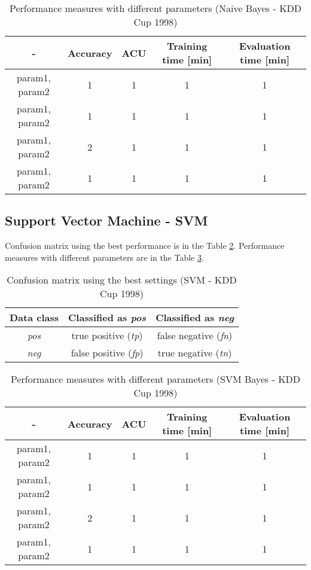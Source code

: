 \documentclass[11pt,a4paper,titlepage]{article}
\begin{document}
  \begin{table}
  \centering
  \begin{tabular}{| c | c | c | c | c |}
    \hline
     		-	   & Accuracy & 	ACU 	& Training time [min] & Evaluation time [min] \\ \hline
    param1, param2 &  1 	  &     1		& 		1			  & 		1 		\\ \hline
    param1, param2 & 	1	  & 	1 		& 		1			  &			1 		\\ \hline
    param1, param2 & 	2	  & 	1		& 		1			  &			1		\\ \hline
    param1, param2 &  1       & 	1		& 		1			  &			1			\\
    \hline
  \end{tabular}
  \caption{Performance measures with different parameters (Naive Bayes - KDD Cup 1998)}
  \label{table:BayesKDD}
  \end{table}
  
\subsection{Support Vector Machine - SVM}

Confusion matrix using the best performance is in the Table \ref{table:confusionMatrixSVMKDD}. Performance measures with different parameters are in the Table \ref{table:SVMKDD}.
\begin{table}
  \centering
  \begin{tabular}{| c | c | c |}
    \hline
    Data class & Classified as \textit{pos} & Classified as \textit{neg} \\ \hline
    \textit{pos} & true positive (\textit{tp}) & false negative (\textit{fn}) \\ \hline
    \textit{neg} & false positive (\textit{fp}) & true negative (\textit{tn}) \\
    \hline
  \end{tabular}
  \caption{Confusion matrix using the best settings (SVM - KDD Cup 1998)}
  \label{table:confusionMatrixSVMKDD}
  \end{table}
  
  \begin{table}
  \centering
  \begin{tabular}{| c | c | c | c | c |}
    \hline
     		-	   & Accuracy & 	ACU 	& Training time [min] & Evaluation time [min] \\ \hline
    param1, param2 &  1 	  &     1		& 		1			  & 		1 		\\ \hline
    param1, param2 & 	1	  & 	1 		& 		1			  &			1 		\\ \hline
    param1, param2 & 	2	  & 	1		& 		1			  &			1		\\ \hline
    param1, param2 &  1       & 	1		& 		1			  &			1			\\
    \hline
  \end{tabular}
  \caption{Performance measures with different parameters (SVM Bayes - KDD Cup 1998)}
  \label{table:SVMKDD}
  \end{table}
\end{document}
